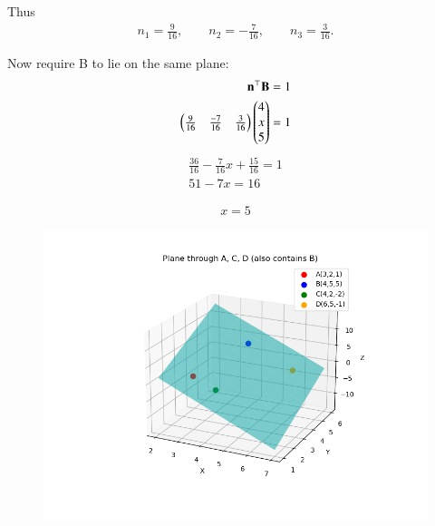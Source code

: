 \documentclass[journal]{IEEEtran}
\begin{document}
Thus
\begin{align}
n_1=\frac{9}{16},\qquad n_2=-\frac{7}{16},\qquad n_3=\frac{3}{16}.
\end{align}

Now require B to lie on the same plane:
\begin{align}
\mathbf{n}^\top\mathbf{B}=1 \\ 
\begin{pmatrix}\frac{9}{16} & \frac{-7}{16} & \frac{3}{16}\end{pmatrix}\begin{pmatrix}4 \\ x \\ 5\end{pmatrix}=1
\end{align}
\begin{align}
\frac{36}{16} - \frac{7}{16}x + \frac{15}{16} = 1 \\ 
51-7x=16 
\end{align}

\begin{align}
\boxed{x=5}
\end{align}

\begin{figure}[H]
    \centering
    \includegraphics[width=1\linewidth]{figs/plot7.png}
    \caption{}
    \label{fig:placeholder}
\end{figure}
\end{document}

